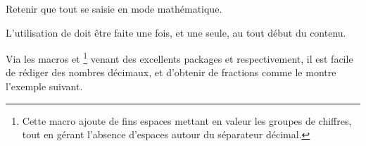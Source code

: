 \documentclass[10pt, a4paper]{article}
\begin{document}


\begin{tdocexa}
    \leavevmode

\end{tdocexa}


\begin{tdocnote}
	Retenir que tout se saisie en mode mathématique.
\end{tdocnote}


\begin{tdocwarn}
	L'utilisation de  doit être faite une fois, et une seule, au tout début du contenu.
\end{tdocwarn}




\begin{tdocexa}
    \leavevmode

\end{tdocexa}




\begin{tdocexa}
    \leavevmode

\end{tdocexa}



\begin{tdoctip}
%
    Via les macros  et 
    \footnote{
    	Cette macro ajoute de fins espaces mettant en valeur les groupes de chiffres, tout en gérant l'absence d'espaces autour du séparateur décimal.
    }
    venant des excellents packages  et  respectivement, il est facile de rédiger des nombres décimaux, et d'obtenir de  fractions comme le montre l'exemple suivant.

\end{tdoctip}
\end{document}
